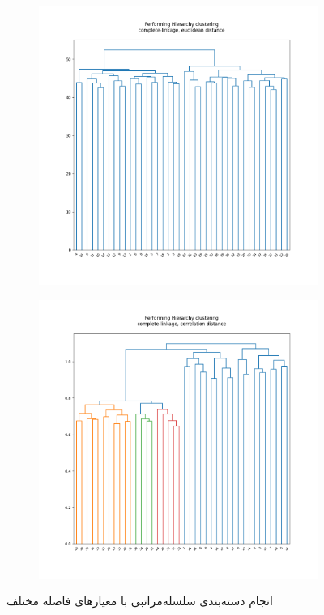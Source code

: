 \documentclass[12pt, a4paper]{article}
\begin{document}
\begin{figure}[h]
\begin{subfigure}{0.45\linewidth}
    \end{subfigure}
    \newline
    \begin{subfigure}{0.45\linewidth}
        \includegraphics[width=\linewidth]{images/q3/d/complete_euclidean.png}
    \end{subfigure}
    \hfill
    \begin{subfigure}{0.45\linewidth}
        \includegraphics[width=\linewidth]{images/q3/d/complete_correlation.png}
    \end{subfigure}
    \caption{انجام دسته‌بندی سلسله‌مراتبی با معیار‌های فاصله مختلف}
    \label{hierarchical_clustering}
\end{figure}
\end{document}

